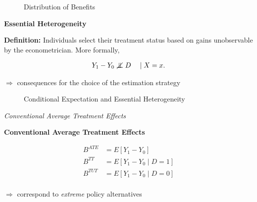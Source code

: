 \begin{frame}
\begin{figure}\caption{Distribution of Benefits}
\end{figure}
\end{frame}

\begin{frame}
\textbf{Essential Heterogeneity}\vspace{0.5cm}

\textbf{Definition:} Individuals select their treatment status based on
gains unobservable by the econometrician. More formally,

\begin{align*}
Y_1 - Y_0 \notindep D\quad \mid X = x.
\end{align*}

\(\Rightarrow\) consequences for the choice of the estimation strategy

\end{frame}


\begin{frame}
\begin{figure}\caption{Conditional Expectation and Essential Heterogeneity}
\end{figure}
\end{frame}
\begin{frame}\begin{center}
\LARGE\textit{Conventional Average Treatment Effects}
\end{center}\end{frame}


\begin{frame}
\textbf{Conventional Average Treatment Effects}

\begin{align*}
B^{ATE} & = E[Y_1 - Y_0 ]\\
B^{TT} & = E[Y_1 - Y_0 \mid D = 1]\\
B^{TUT} & = E[Y_1 - Y_0 \mid D = 0]\\
\end{align*}

\(\Rightarrow\) correspond to \emph{extreme} policy alternatives

\end{frame}



